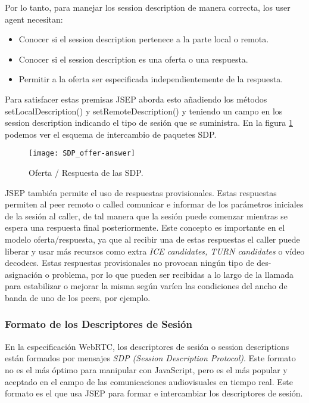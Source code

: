 Por lo tanto, para manejar los session description de manera correcta, los user agent necesitan:

\begin{itemize}
\item Conocer si el session description pertenece a la parte local o remota.
\item Conocer si el session description es una oferta o una respuesta.
\item Permitir a la oferta ser especificada independientemente de la respuesta.
\end{itemize}

Para satisfacer estas premisas JSEP aborda esto añadiendo los métodos setLocalDescription() y setRemoteDescription() y teniendo un campo en los session description indicando el tipo de sesión que se suministra. En la figura \ref{fig:sdp-oferta-respuesta} podemos ver el esquema de intercambio de paquetes SDP.\\

\begin{figure}[htb]
\centering
\texttt{[image: SDP\_offer-answer]}
\caption{Oferta / Respuesta de las SDP.}
\label{fig:sdp-oferta-respuesta}
\end{figure}

JSEP también permite el uso de respuestas provisionales. Estas respuestas permiten al peer remoto o called comunicar e informar de los parámetros iniciales de la sesión al caller, de tal manera que la sesión puede comenzar mientras se espera una respuesta final posteriormente. Este concepto es importante en el modelo oferta/respuesta, ya que al recibir una de estas respuestas el caller puede liberar y usar más recursos como extra \textit{ICE candidates, TURN candidates} o vídeo decodecs. Estas respuestas provisionales no provocan ningún tipo de des-asignación o problema, por lo que pueden ser recibidas a lo largo de la llamada para estabilizar o mejorar la misma según varíen las condiciones del ancho de banda de uno de los peers, por ejemplo.\\


\subsubsection{Formato de los Descriptores de Sesión}

En la especificación WebRTC, los descriptores de sesión o session descriptions están formados por mensajes \textit{SDP (Session Description Protocol)}. Este formato no es el más óptimo para manipular con JavaScript, pero es el más popular y aceptado en el campo de las comunicaciones audiovisuales en tiempo real. Este formato es el que usa JSEP para formar e intercambiar los descriptores de sesión.\\

